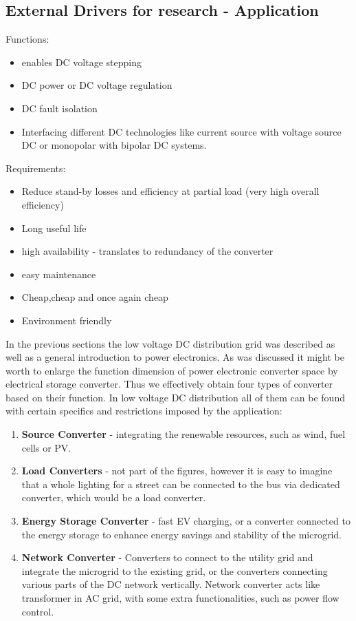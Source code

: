 \documentclass[]{scrartcl}
\begin{document}
	

	
	

\subsection{External Drivers for research - Application}
Functions: 
\begin{itemize}
	\item enables DC voltage stepping
	\item DC power or DC voltage regulation
	\item DC fault isolation
	\item Interfacing different DC technologies like current source with voltage source DC or monopolar with bipolar DC systems.
\end{itemize}

Requirements:
\begin{itemize}
	\item Reduce stand-by losses and efficiency at partial load (very high overall efficiency)
	\item Long useful life
	\item high availability  - translates to redundancy of the converter
	\item easy maintenance
	\item Cheap,cheap and once again cheap
	\item Environment friendly 
\end{itemize}



In the previous sections the low voltage DC distribution grid was described as well as a general introduction to power electronics. As was discussed it might be worth to enlarge the function dimension of power electronic converter space by electrical storage converter. Thus we effectively obtain four types of converter based on their function. In low voltage DC distribution all of them can be found with certain specifics and restrictions imposed by the application:

\begin{enumerate}
	\item \textbf{Source Converter }- integrating the renewable resources, such as wind, fuel cells or PV. 
	\item \textbf{Load Converters} - not part of the figures, however it is easy to imagine that a whole lighting for a street can be connected to the bus via dedicated converter, which would be a load converter. 
	\item \textbf{Energy Storage Converter } - fast EV charging, or a converter connected to the energy storage to enhance energy savings and stability of the microgrid.
	\item \textbf{Network Converter} - Converters to connect to the utility grid and integrate the microgrid to the existing grid, or the converters connecting various parts of the DC network vertically. Network converter acts like transformer in AC grid, with some extra functionalities, such as power flow control.
	
	\end{enumerate}
	\newpage
\end{document}
